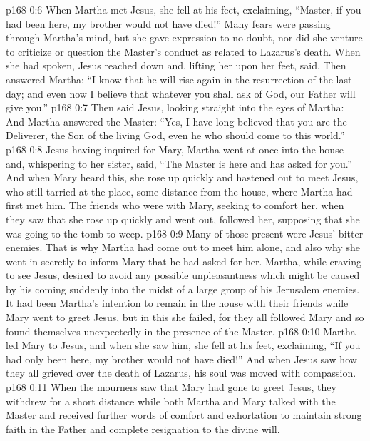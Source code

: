 \vs p168 0:6 When Martha met Jesus, she fell at his feet, exclaiming, “Master, if you had been here, my brother would not have died!” Many fears were passing through Martha’s mind, but she gave expression to no doubt, nor did she venture to criticize or question the Master’s conduct as related to Lazarus’s death. When she had spoken, Jesus reached down and, lifting her upon her feet, said,  Then answered Martha: “I know that he will rise again in the resurrection of the last day; and even now I believe that whatever you shall ask of God, our Father will give you.”
\vs p168 0:7 Then said Jesus, looking straight into the eyes of Martha:  And Martha answered the Master: “Yes, I have long believed that you are the Deliverer, the Son of the living God, even he who should come to this world.”
\vs p168 0:8 Jesus having inquired for Mary, Martha went at once into the house and, whispering to her sister, said, “The Master is here and has asked for you.” And when Mary heard this, she rose up quickly and hastened out to meet Jesus, who still tarried at the place, some distance from the house, where Martha had first met him. The friends who were with Mary, seeking to comfort her, when they saw that she rose up quickly and went out, followed her, supposing that she was going to the tomb to weep.
\vs p168 0:9 Many of those present were Jesus’ bitter enemies. That is why Martha had come out to meet him alone, and also why she went in secretly to inform Mary that he had asked for her. Martha, while craving to see Jesus, desired to avoid any possible unpleasantness which might be caused by his coming suddenly into the midst of a large group of his Jerusalem enemies. It had been Martha’s intention to remain in the house with their friends while Mary went to greet Jesus, but in this she failed, for they all followed Mary and so found themselves unexpectedly in the presence of the Master.
\vs p168 0:10 Martha led Mary to Jesus, and when she saw him, she fell at his feet, exclaiming, “If you had only been here, my brother would not have died!” And when Jesus saw how they all grieved over the death of Lazarus, his soul was moved with compassion.
\vs p168 0:11 When the mourners saw that Mary had gone to greet Jesus, they withdrew for a short distance while both Martha and Mary talked with the Master and received further words of comfort and exhortation to maintain strong faith in the Father and complete resignation to the divine will.
